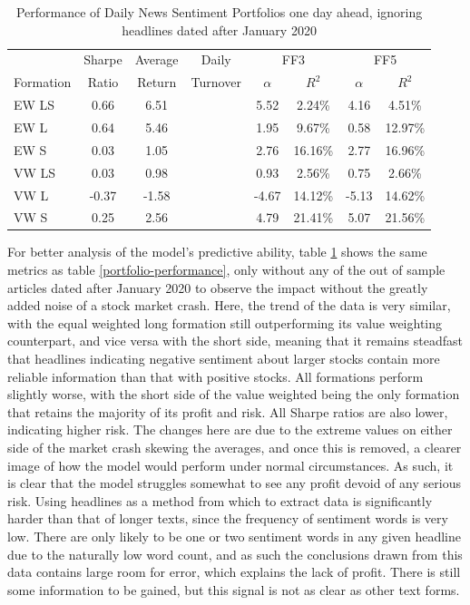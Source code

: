 \begin{table}[!ht]
\begin{center}
\begin{tabular}{lccccccc}
      \toprule
      & Sharpe &  Average & Daily & \multicolumn{2}{c}{FF3} & \multicolumn{2}{c}{FF5} \\
      \cmidrule(lr){5-6}
      \cmidrule(lr){7-8}
      Formation & Ratio & Return & Turnover & $\alpha$ & $R^2$ & $\alpha$ & $R^2$ \\
      \midrule
EW LS & 0.66 & 6.51 & & 5.52 & 2.24\% & 4.16 & 4.51\% \\
EW L & 0.64 & 5.46 & & 1.95 & 9.67\% & 0.58 & 12.97\% \\
EW S & 0.03 & 1.05 & & 2.76 & 16.16\% & 2.77 & 16.96\% \\
VW LS & 0.03 & 0.98 & & 0.93 & 2.56\% & 0.75 & 2.66\% \\
VW L & -0.37 & -1.58 & & -4.67 & 14.12\% & -5.13 & 14.62\% \\
VW S & 0.25 & 2.56 & & 4.79 & 21.41\% & 5.07 & 21.56\% \\
      \bottomrule
\end{tabular}
\caption{Performance of Daily News Sentiment Portfolios one day ahead, ignoring headlines dated after January 2020}
\label{tab:portfolio-performance-no-covid}
\end{center}
\end{table}

For better analysis of the model's predictive ability, table \ref{tab:portfolio-performance-no-covid} shows the same metrics as table \ref{portfolio-performance}, only without any of the out of sample articles dated after January 2020 to observe the impact without the greatly added noise of a stock market crash. Here, the trend of the data is very similar, with the equal weighted long formation still outperforming its value weighting counterpart, and vice versa with the short side, meaning that it remains steadfast that headlines indicating negative sentiment about larger stocks contain more reliable information than that with positive stocks. All formations perform slightly worse, with the short side of the value weighted being the only formation that retains the majority of its profit and risk. All Sharpe ratios are also lower, indicating higher risk. The changes here are due to the extreme values on either side of the market crash skewing the averages, and once this is removed, a clearer image of how the model would perform under normal circumstances. As such, it is clear that the model struggles somewhat to see any profit devoid of any serious risk. Using headlines as a method from which to extract data is significantly harder than that of longer texts, since the frequency of sentiment words is very low. There are only likely to be one or two sentiment words in any given headline due to the naturally low word count, and as such the conclusions drawn from this data contains large room for error, which explains the lack of profit. There is still some information to be gained, but this signal is not as clear as other text forms.


